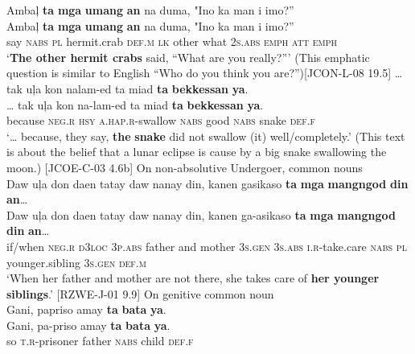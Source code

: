\ea
\label{ex:hermitcrab}
Ambaļ	\textbf{ta}	\textbf{mga}	\textbf{umang}	\textbf{an}	na	duma,	"Ino	ka	man	i	imo?” \\\smallskip
 \gll Ambaļ	\textbf{ta}	\textbf{mga}	\textbf{umang}	\textbf{an}	na	duma,	"Ino	ka	man	i	imo?” \\
say	\textsc{nabs}	\textsc{pl}	hermit.crab	\textsc{def.m}	\textsc{lk}	other	what	2\textsc{s.abs}	\textsc{emph}	\textsc{att}	\textsc{emph}	 \\
\glt ‘\textbf{The other hermit crabs} said, “What are you really?”' (This emphatic question is similar to English “Who do you think you are?”)[JCON-L-08 19.5] 
\z
\ea
\label{bkm:Ref447721088}
\label{ex:snake}
… tak  uļa  kon  nalam-ed  ta  miad  \textbf{ta}  \textbf{bekkessan}  \textbf{ya}. \\\smallskip
 \gll … tak  uļa  kon  na-lam-ed  ta  miad  \textbf{ta}  \textbf{bekkessan}  \textbf{ya}. \\
{} because  \textsc{neg.r} \textsc{hsy} \textsc{a.hap.r}-swallow  \textsc{nabs}  good  \textsc{nabs}  snake  \textsc{def.f} \\
\glt ‘… because, they say, \textbf{the} \textbf{snake} did not swallow (it) well/completely.’ (This text is about the belief that a lunar eclipse is cause by a big snake swallowing the moon.) [JCOE-C-03 4.6b]
\z
\ea
On non-absolutive Undergoer, common nouns \\
Daw	uļa	don	daen	tatay	daw	nanay	din,	kanen gasikaso \textbf{ta}	\textbf{mga} \textbf{mangngod}	\textbf{din} \textbf{an}… \\\smallskip
 \gll Daw	uļa	don	daen	tatay	daw	nanay	din,	kanen ga-asikaso \textbf{ta}	\textbf{mga} \textbf{mangngod}	\textbf{din} \textbf{an}… \\
if/when	\textsc{neg.r}	\textsc{d}3\textsc{loc}	3\textsc{p.abs}	father	and	mother	3\textsc{s.gen}	3\textsc{s.abs} \textsc{i.r}-take.care \textsc{nabs}	\textsc{pl} younger.sibling	3\textsc{s.gen} \textsc{def.m} \\
\glt ‘When her father and mother are not there, she takes care of \textbf{her younger siblings}.’ [RZWE-J-01 9.9]
\z
\ea
\label{bkm:Ref447721537}
\label{ex:prison}
On genitive common noun \\
Gani,  papriso  amay  \textbf{ta}  \textbf{bata}  \textbf{ya}. \\\smallskip
 \gll Gani,  pa-priso  amay  \textbf{ta}  \textbf{bata}  \textbf{ya}. \\
so  \textsc{t.r}-prisoner  father  \textsc{nabs}  child  \textsc{def.f} \\

